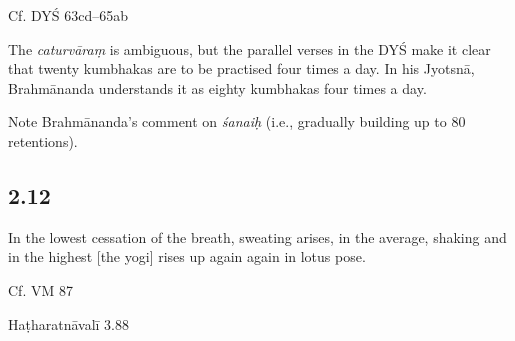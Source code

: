 \begin{ekdosis}
\begin{testimonia}[hp02_011]
Cf. DYŚ 63cd--65ab

\begin{versinnote}
\end{versinnote}
\end{testimonia}

\begin{philcomm}[hp02_011]
The \emph{caturvāraṃ} is ambiguous, but the parallel verses in the DYŚ make it clear that twenty kumbhakas are to be practised four times a day. In his Jyotsnā, Brahmānanda understands it as eighty kumbhakas four times a day.

Note Brahmānanda’s comment on \emph{śanaiḥ} (i.e., gradually building up to 80 retentions).

\end{philcomm}

\subsection*{2.12}
\begin{translation}[hp02_012]
In the lowest cessation of the breath, sweating arises, in the average, shaking and in the highest [the yogi] rises up again again in lotus pose.
\end{translation}

\begin{sources}[hp02_012]
Cf. VM 87

\begin{versinnote}
\end{versinnote}
\end{sources}

\begin{testimonia}[hp02_012]
Haṭharatnāvalī 3.88

\begin{versinnote}
\end{versinnote}


\end{testimonia}
\end{ekdosis}
